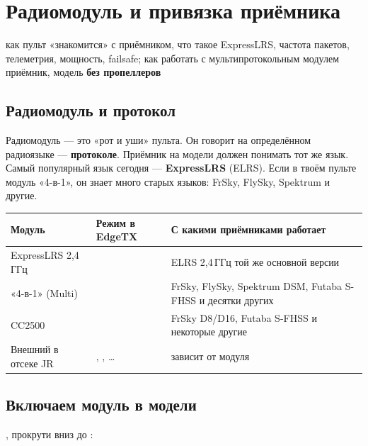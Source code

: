 \chapter{Радиомодуль и привязка приёмника}
\label{ch:rf}
\chapterintro
  {как пульт «знакомится» с приёмником, что такое ExpressLRS, частота пакетов, телеметрия,
   мощность, failsafe; как работать с мультипротокольным модулем}
  {приёмник, модель \textbf{без пропеллеров}}

\section{Радиомодуль и протокол}

\begin{simple}
Радиомодуль --- это «рот и уши» пульта. Он говорит на определённом радиоязыке ---
\textbf{протоколе}. Приёмник на модели должен понимать тот же язык. Самый популярный язык
сегодня --- \textbf{ExpressLRS} (ELRS). Если в твоём пульте модуль «4-в-1», он знает много
старых языков: FrSky, FlySky, Spektrum и другие.
\end{simple}

\begin{center}\small
\renewcommand{\arraystretch}{1.25}
\begin{tabularx}{\linewidth}{@{}L{34mm}L{32mm}Y@{}}
\toprule
\textbf{Модуль} & \textbf{Режим в EdgeTX} & \textbf{С какими приёмниками работает} \\
\midrule
ExpressLRS 2,4\,ГГц &  & ELRS 2,4\,ГГц той же основной версии \\
«4-в-1» (Multi) &  & FrSky, FlySky, Spektrum DSM, Futaba S-FHSS и десятки других \\
CC2500 &  & FrSky D8/D16, Futaba S-FHSS и некоторые другие \\
Внешний в отсеке JR & , , … & зависит от модуля \\
\bottomrule
\end{tabularx}
\end{center}

\section{Включаем модуль в модели}

, прокрути вниз до :

